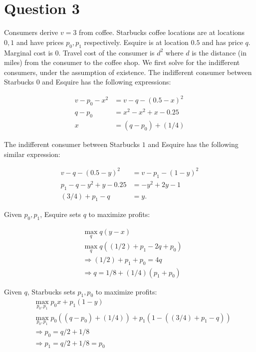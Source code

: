 \documentclass[11pt]{article} %
\begin{document}

\section{Question 3}

Consumers derive $v = 3$ from coffee. Starbucks coffee locations are at locations $0,1$ and have prices $p_0,p_1$ respectively. Esquire is at location $0.5$ and has price $q$. Marginal cost is 0. Travel cost of the consumer is $d^2$ where $d$ is the distance (in miles) from the consumer to the coffee shop. We first solve for the indifferent consumers, under the assumption of existence. The indifferent consumer between Starbucks $0$ and Esquire has the following expressions:

\begin{align*}
v - p_0 - x^2 &= v - q - (0.5 - x)^2 \\
q-p_0 &= x^2 - x^2 + x - 0.25\\
x &= (q-p_0) + (1/4)
\end{align*}

The indifferent consumer between Starbucks $1$ and Esquire has the following similar expression:

\begin{align*}
 v - q - (0.5 - y)^2 &= v - p_1 - (1-y)^2\\
p_1 - q - y^2 + y - 0.25 &= -y^2 + 2y - 1\\
(3/4) + p_1 - q  &= y .
\end{align*}

Given $p_0,p_1$, Esquire sets $q$ to maximize profits:

\begin{align*}
&\max_{q} q(y - x) \\
&\max_{q} q((1/2) + p_1 - 2q  + p_0)\\
&\Rightarrow (1/2) + p_1 + p_0 = 4q \\
&\Rightarrow q = 1/8 + (1/4)(p_1 + p_0)
\end{align*}

Given $q$, Starbucks sets $p_1,p_0$ to maximize profits:
\begin{align*}
&\max_{p_0,p_1} p_0 x + p_1 (1-y)\\
&\max_{p_0,p_1} p_0 ((q-p_0) + (1/4)) + p_1(1-((3/4) + p_1 - q)) \\
&\Rightarrow p_0 = q/2 +1/8\\
&\Rightarrow p_1 =  q/2 +1/8 = p_0
\end{align*}
\end{document}
